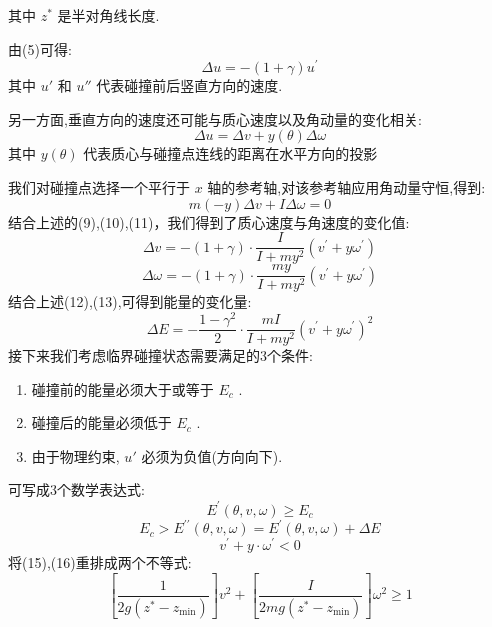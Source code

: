 \documentclass[UTF8]{gapd}
\begin{document}
其中  $z^*$  是半对角线长度.

由(5)可得:
\begin{equation}
\Delta u=-(1+\gamma) u^{\prime}
\end{equation}
其中   $u'$  和 $u''$    代表碰撞前后竖直方向的速度.

另一方面,垂直方向的速度还可能与质心速度以及角动量的变化相关:
\begin{equation}
\Delta u=\Delta v+y(\theta) \Delta \omega
\end{equation}
其中   $y(\theta)$    代表质心与碰撞点连线的距离在水平方向的投影

我们对碰撞点选择一个平行于 $x$  轴的参考轴,对该参考轴应用角动量守恒,得到:
\begin{equation}
m\left( -y \right) \varDelta v+I\varDelta \omega =0
\end{equation}
结合上述的(9),(10),(11)，我们得到了质心速度与角速度的变化值:
\begin{equation}
\Delta v=-(1+\gamma) \cdot \frac{I}{I+m y^{2}}\left(v^{\prime}+y \omega^{\prime}\right)
\end{equation}
\begin{equation}
\Delta \omega=-(1+\gamma) \cdot \frac{m y}{I+m y^{2}}\left(v^{\prime}+y \omega^{\prime}\right)
\end{equation}
结合上述(12),(13),可得到能量的变化量:
\begin{equation}
\Delta E=-\frac{1-\gamma^{2}}{2} \cdot \frac{m I}{I+m y^{2}}\left(v^{\prime}+y \omega^{\prime}\right)^{2}
\end{equation}
接下来我们考虑临界碰撞状态需要满足的3个条件:
\begin{enumerate}
	\item 碰撞前的能量必须大于或等于  $E_{c}$   .
	\item 碰撞后的能量必须低于 $E_{c}$    .
	\item 由于物理约束,   $u'$ 必须为负值(方向向下).
\end{enumerate}
可写成3个数学表达式:
\begin{equation}
E^{\prime}(\theta, v, \omega) \geq E_{c}
\end{equation}
\begin{equation}
E_{c}>E^{\prime \prime}(\theta, v, \omega)=E^{\prime}(\theta, v, \omega)+\Delta E
\end{equation}
\begin{equation}
v^{\prime}+y \cdot \omega^{\prime}<0
\end{equation}
将(15),(16)重排成两个不等式:
\begin{equation}
\left[\frac{1}{2 g\left(z^{*}-z_{\min }\right)}\right] v^{2}+\left[\frac{I}{2 m g\left(z^{*}-z_{\min }\right)}\right] \omega^{2} \geq 1
\end{equation}
\end{document}

